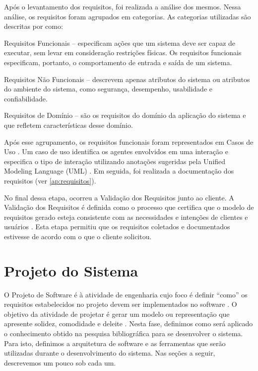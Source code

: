Após o levantamento dos requisitos, foi realizada a análise dos mesmos. Nessa análise, os requisitos foram agrupados em categorias. As categorias utilizadas são descritas por 
 como:
\begin{alineascomponto}
    \item Requisitos Funcionais -- especificam ações que um sistema deve ser
capaz de executar, sem levar em consideração restrições físicas. Os requisitos
funcionais especificam, portanto, o comportamento de entrada e saída de um
sistema.
    \item Requisitos Não Funcionais -- descrevem apenas atributos do sistema ou
atributos do ambiente do sistema, como segurança, desempenho, usabilidade e
confiabilidade.
    \item Requisitos de Domínio -- são os requisitos do domínio da aplicação do sistema e que refletem características desse domínio.
\end{alineascomponto}

Após esse agrupamento, os requisitos funcionais foram representados em Casos de Uso \cite{jacobson92engenharia}. Um caso de uso identifica os agentes envolvidos em uma interação e especifica o tipo 
de interação utilizando anotações sugeridas pela Unified Modeling Language (UML) 
. Em seguida, foi realizada a documentação dos requisitos (ver \autoref{ap:requisitos}).

No final dessa etapa, ocorreu a Validação dos Requisitos junto ao cliente.  A Validação dos Requisitos é definida como o processo que certifica que o modelo de requisitos gerado  esteja  consistente  
com  as  necessidades  e  intenções  de  clientes  e usuários \cite{rilston2003metodologia}. Esta etapa permitiu que os requisitos coletados e documentados estivesse de acordo com o que o 
cliente solicitou.

\section{Projeto do Sistema}

O Projeto de Software é à atividade de engenharia cujo foco é definir ``como'' os requisitos estabelecidos no projeto devem ser implementados no software \cite{pressman2006engenharia}. O objetivo da  
atividade de projetar é gerar um modelo ou representação que apresente solidez, comodidade e deleite \cite{pressman2006engenharia}. Nesta fase, definimos como será aplicado o conhecimento obtido na 
pesquisa bibliográfica para se desenvolver o sistema. Para isto, definimos a arquitetura de software e as ferramentas que serão utilizadas durante o desenvolvimento do sistema. Nas seções a seguir, 
descrevemos um pouco sob cada um.

